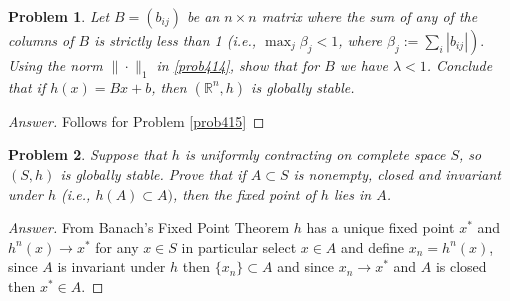 \documentclass{article}
\newtheorem{problem}{Problem}[section]
\begin{document}
\begin{problem}
    Let $B=\left(b_{i j}\right)$ be an $n \times n$ matrix where the sum of any of the columns of $B$ is strictly less than 1 (i.e., $\max _{j} \beta_{j}<1$, where $\left.\beta_{j}:=\sum_{i}\left|b_{i j}\right|\right) .$ Using the norm $\|\cdot\|_{1}$ in \ref{prob414}, show that for $B$ we have $\lambda<1$. Conclude that if $h(x)=B x+b$, then $\left(\mathbb{R}^{n}, h\right)$ is globally stable.
\end{problem}

\begin{proof}[Answer]
    Follows for Problem \ref{prob415}
\end{proof}

\begin{problem}
    Suppose that $h$ is uniformly contracting on complete space $S$, so $(S, h)$ is globally stable. Prove that if $A \subset S$ is nonempty, closed and invariant under $h$ (i.e., $h(A) \subset A)$, then the fixed point of $h$ lies in $A$.
\end{problem}

\begin{proof}[Answer]
    From Banach's Fixed Point Theorem $h$ has a unique fixed point $x^*$ and $h^n(x)\to x^*$ for any $x \in S$ in particular select $x\in A$ and define $x_n = h^n(x)$, since $A$ is invariant under $h$ then $\{x_n\}\subset A$ and since $x_n \to x^*$ and $A$ is closed then $x^*\in A$. 
\end{proof}
\end{document}
